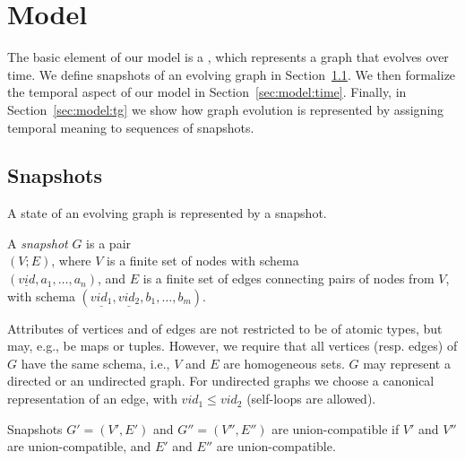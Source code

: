 \section{Model}
\label{sec:model}

The basic element of our model is a \tg, which represents a graph that
evolves over time.  We define snapshots of an evolving graph in
Section~\ref{sec:model:structure}.  We then formalize the temporal
aspect of our model in Section~\ref{sec:model:time}.  Finally, in
Section~\ref{sec:model:tg} we show how graph evolution is represented
by assigning temporal meaning to sequences of snapshots.

\subsection{Snapshots}
\label{sec:model:structure}

A state of an evolving graph is represented by a snapshot.

\begin{definition}[Snapshot]
A {\em snapshot} $G$ is a pair\\ $(V; E)$, where $V$ is a finite set of
nodes with schema\\ $(\underline{vid}, a_1, \ldots, a_n)$, and $E$ is a
finite set of edges connecting pairs of nodes from $V$, with schema
$(\underline{vid_1}, \underline{vid_2}, b_1, \ldots, b_m)$.
\label{def:sg} 
\vspace{-0.3cm}
\end{definition}

Attributes of vertices and of edges are not restricted to be of atomic
types, but may, e.g., be maps or tuples. However, we require that all
vertices (resp. edges) of $G$ have the same schema, i.e., $V$ and $E$
are homogeneous sets. $G$ may represent a directed or an undirected
graph.  For undirected graphs we choose a canonical representation of
an edge, with $vid_1 \leq vid_2$ (self-loops are allowed).

\begin{definition} 
Snapshots $G' = (V', E')$ and $G'' = (V'', E'')$ are
union-compatible if $V'$ and $V''$ are union-compatible, and $E'$
and $E''$ are union-compatible.
\label{def:scompat}
\end{definition}


